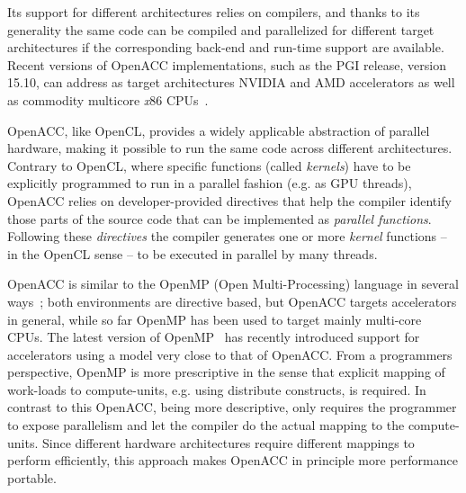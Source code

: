 \documentclass[times]{cpeauth}
\begin{document}
Its support for different architectures relies on compilers, and thanks 
to its generality the same code can be compiled and parallelized for different 
target architectures if the corresponding back-end and run-time support are available. 
%
Recent versions of OpenACC implementations, such as the PGI release, version 15.10, 
can address as target architectures NVIDIA and AMD accelerators as well as 
commodity multicore {\em x}86 CPUs~\cite{nvidia-portability}.

OpenACC, like OpenCL, provides a widely applicable abstraction of parallel 
hardware, making it possible to run the same code across different 
architectures.
%
Contrary to OpenCL, where specific functions (called \textit{kernels}) have to
be explicitly programmed to run in a parallel fashion (e.g. as GPU threads), 
OpenACC relies on developer-provided directives that help the compiler identify those 
parts of the source code that can be implemented as {\em parallel functions}.
% 
Following these {\em directives} the compiler generates one or more 
\textit{kernel} functions -- in the OpenCL sense -- to be executed in parallel 
by many threads.

OpenACC is similar to the OpenMP (Open Multi-Processing) language in several 
ways~\cite{Wienke2014812}; both environments are directive based, but OpenACC 
targets accelerators in general, while so far OpenMP has been used to target 
mainly multi-core CPUs. The latest version of OpenMP~\cite{openmp4} has recently 
introduced support for accelerators using a model very close to that of 
OpenACC. From a programmers perspective, OpenMP is more prescriptive in the 
sense that explicit mapping of work-loads to compute-units, e.g. using distribute 
constructs, is required. In contrast to this OpenACC, being more descriptive,
only requires the programmer to expose parallelism and let the compiler do the 
actual mapping to the compute-units.
%
Since different hardware architectures require different mappings to perform 
efficiently, this approach makes OpenACC in principle more performance portable. 
\end{document}
